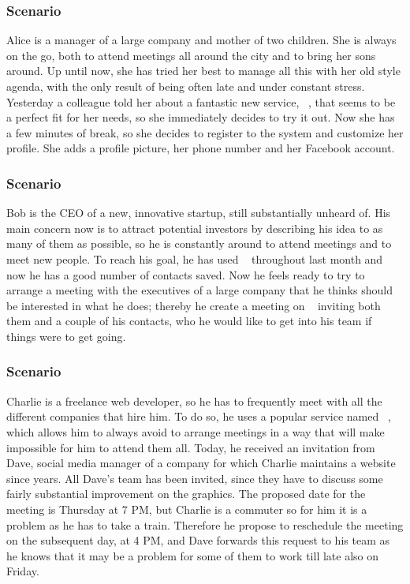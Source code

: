 
\subsubsection{Scenario \thecountScenarios }

Alice is a manager of a large company and mother of two children. She is always on the go, both to attend meetings all around the city and to bring her sons around. Up until now, she has tried her best to manage all this with her old style agenda, with the only result of being often late and under constant stress. Yesterday a colleague told her about a fantastic new service, \projectname~, that seems to be a perfect fit for her needs, so she immediately decides to try it out. Now she has a few minutes of break, so she decides to register to the system and customize her profile. She adds a profile picture, her phone number and her Facebook account.


\subsubsection{Scenario \thecountScenarios }

Bob is the CEO of a new, innovative startup, still substantially unheard of. His main concern now is to attract potential investors by describing his idea to as many of them as possible, so he is constantly around to attend meetings and to meet new people. To reach his goal, he has used \projectname~ throughout last month and now he has a good number of contacts saved. Now he feels ready to try to arrange a meeting with the executives of a large company that he thinks should be interested in what he does; thereby he create a meeting on \projectname~ inviting both them and a couple of his contacts, who he would like to get into his team if things were to get going.


\subsubsection{Scenario \thecountScenarios }

Charlie is a freelance web developer, so he has to frequently meet with all the different companies that hire him. To do so, he uses a popular service named \projectname~, which allows him to always avoid to arrange meetings in a way that will make impossible for him to attend them all. Today, he received an invitation from Dave, social media manager of a company for which Charlie maintains a website since years. All Dave's team has been invited, since they have to discuss some fairly substantial improvement on the graphics. The proposed date for the meeting is Thursday at 7 PM, but Charlie is a commuter so for him it is a problem as he has to take a train. Therefore he propose to reschedule the meeting on the subsequent day, at 4 PM, and Dave forwards this request to his team as he knows that it may be a problem for some of them to work till late also on Friday.


